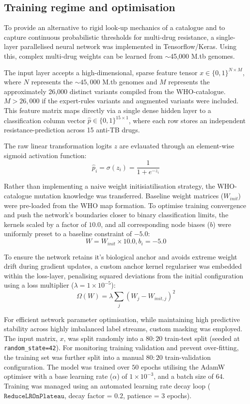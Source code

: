 \subsection{Training regime and optimisation}
To provide an alternative to rigid look-up mechanics of a catalogue and to capture continuous probabilistic thresholds for multi-drug resistance, a single-layer parallelised neural network was implemented in Tensorflow/Keras. Using this, complex multi-drug weights can be learned from $\sim$45,000 M.tb genomes.

The input layer accepts a high-dimensional, sparse feature tensor $x \in \{0,1\}^{N\times M}$, where $N$ represents the $\sim45,000$ M.tb genomes and $M$ represents the approximately 26,000 distinct variants compiled from the WHO-catalogue. $M > 26,000$ if the expert-rules variants and augmented variants were included. This feature matrix maps directly via a single dense hidden layer to a classification column vector $\hat{p}\in \{0,1\}^{15\times 1}$, where each row stores an independent resistance-prediction across 15 anti-TB drugs. 

The raw linear transformation logits $z$ are evlauated through an element-wise sigmoid activation function: $$ \hat{p}_i = \sigma(z_i) = \frac{1}{1+e^{-z_i}}$$

Rather than implementing a naive weight initisiatilisation strategy, the WHO-catalogue mutation knowledge was transferred. Baseline weight matrices ($W_{init}$) were pre-loaded from the WHO map formation. To optimise training convergence and push the network's boundaries closer to binary classification limits, the kernels scaled by a factor of $10.0$, and all corresponding node biases ($b$) were uniformly preset to a baseline constraint of $-5.0$: $$ W = W_{init}\times 10.0, b_i=-5.0 $$

To ensure the network retains it's biological anchor and avoids extreme weight drift during gradient updates, a custom anchor kernel regulariser was embedded within the loss-layer, penalising squared deviations from the initial configuration using a loss multiplier ($\lambda = 1 \times 10^{-5}$): $$ \Omega(W) = \lambda\sum_{j}(W_j - W_{init,j})^2$$

For efficient network parameter optimisation, while maintaining high predictive stability across highly imbalanced label streams, custom masking was employed. The input matrix, $x$, was split randomly into a $80:20$ train-test split (seeded at \texttt{random\_state=42}). For monitoring training validation and prevent over-fitting, the training set was further split into a manual $80:20$ train-validation configuration. The model was trained over $50$ epochs utilising the AdamW optimiser with a base learning rate ($\alpha$) of $1\times 10^{-3}$, and a batch size of $64$. Training was managed using an automated learning rate decay loop ($\texttt{ReduceLROnPlateau}$, decay factor = $0.2$, patience = $3$ epochs).


